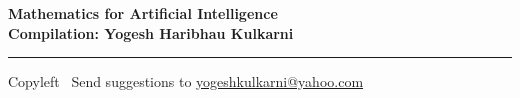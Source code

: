 
\graphicspath{{images/}}



\footnotesize


\begin{center}
\Large{\textbf{Mathematics for Artificial Intelligence\\ Compilation: Yogesh Haribhau Kulkarni}}  
\end{center}

\begin{multicols}{2}

\end{multicols}

\rule{\linewidth}{0.25pt}
\scriptsize
Copyleft \textcopyleft\  Send suggestions to 
\href{http://www.yogeshkulkarni.com}{yogeshkulkarni@yahoo.com}


